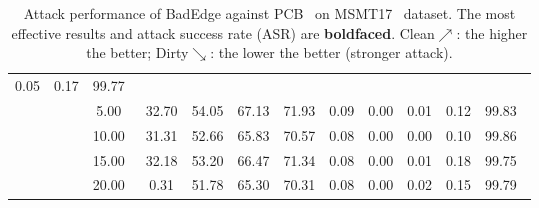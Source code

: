 \begin{table}[htbp]
{\begin{tabular}{cc|c|ccccccccc}
  \multicolumn{1}{c|}{0.05} &
  \multicolumn{1}{c|}{0.17} &
  99.77\ \\ \cline{3-12} 
\multicolumn{1}{c|}{} &
   &
  5.00\ &
  \multicolumn{1}{c|}{32.70} &
  \multicolumn{1}{c|}{54.05} &
  \multicolumn{1}{c|}{67.13} &
  \multicolumn{1}{c|}{71.93} &
  \multicolumn{1}{c|}{0.09} &
  \multicolumn{1}{c|}{0.00} &
  \multicolumn{1}{c|}{0.01} &
  \multicolumn{1}{c|}{0.12} &
  99.83\ \\ \cline{3-12} 
\multicolumn{1}{c|}{} &
   &
  10.00\ &
  \multicolumn{1}{c|}{31.31} &
  \multicolumn{1}{c|}{52.66} &
  \multicolumn{1}{c|}{65.83} &
  \multicolumn{1}{c|}{70.57} &
  \multicolumn{1}{c|}{0.08} &
  \multicolumn{1}{c|}{0.00} &
  \multicolumn{1}{c|}{0.00} &
  \multicolumn{1}{c|}{0.10} &
  99.86\ \\ \cline{3-12} 
\multicolumn{1}{c|}{} &
   &
  15.00\ &
  \multicolumn{1}{c|}{32.18} &
  \multicolumn{1}{c|}{53.20} &
  \multicolumn{1}{c|}{66.47} &
  \multicolumn{1}{c|}{71.34} &
  \multicolumn{1}{c|}{0.08} &
  \multicolumn{1}{c|}{0.00} &
  \multicolumn{1}{c|}{0.01} &
  \multicolumn{1}{c|}{0.18} &
  99.75\ \\ \cline{3-12} 
\multicolumn{1}{c|}{} &
   &
  20.00\ &
  \multicolumn{1}{c|}{0.31} &
  \multicolumn{1}{c|}{51.78} &
  \multicolumn{1}{c|}{65.30} &
  \multicolumn{1}{c|}{70.31} &
  \multicolumn{1}{c|}{0.08} &
  \multicolumn{1}{c|}{0.00} &
  \multicolumn{1}{c|}{0.02} &
  \multicolumn{1}{c|}{0.15} &
  99.79\ \\ \hline
\end{tabular}
}
\caption{
Attack performance of BadEdge against PCB~\cite{sun2018beyond} on MSMT17~\cite{wei2018person}  dataset. The most effective results and attack success rate (ASR) are \textbf{boldfaced}. Clean$\nearrow$: the higher the better; Dirty$\searrow$: the lower the better (stronger attack).}
%
\label{tab:PCB_msmt17}
\end{table}